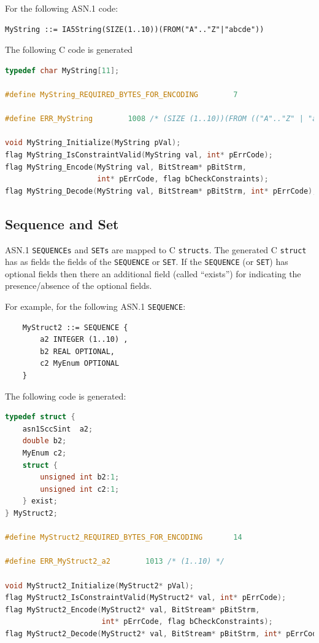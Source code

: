 \documentclass[11pt]{book}
\begin{document}
      For the following ASN.1 code:

\begin{lstlisting}
MyString ::= IA5String(SIZE(1..10))(FROM("A".."Z"|"abcde"))
\end{lstlisting}

      The following C code is generated

\begin{lstlisting}[language=c]
typedef char MyString[11];

#define MyString_REQUIRED_BYTES_FOR_ENCODING		7

#define ERR_MyString		1008 /* (SIZE (1..10))(FROM (("A".."Z" | "abcde"))) */

void MyString_Initialize(MyString pVal);
flag MyString_IsConstraintValid(MyString val, int* pErrCode);
flag MyString_Encode(MyString val, BitStream* pBitStrm, 
                     int* pErrCode, flag bCheckConstraints);
flag MyString_Decode(MyString val, BitStream* pBitStrm, int* pErrCode);
\end{lstlisting}

      \subsection{Sequence and Set}
      ASN.1 \texttt{SEQUENCEs} and \texttt{SETs} are mapped to C \texttt{structs}. 
      The generated C \texttt{struct} has as fields the fields of the \texttt{SEQUENCE} or \texttt{SET}. 
      If the \texttt{SEQUENCE} (or \texttt{SET}) has optional fields then there an additional 
      field (called “exists”) for indicating the presence/absence of the optional fields.

      For example, for the following ASN.1 \texttt{SEQUENCE}:

\begin{lstlisting}
	MyStruct2 ::= SEQUENCE {
		a2 INTEGER (1..10) ,
		b2 REAL OPTIONAL,
		c2 MyEnum OPTIONAL
	}
\end{lstlisting}

      The following code is generated:

\begin{lstlisting}[language=c]
typedef struct {
    asn1SccSint  a2;
    double b2;
    MyEnum c2;
    struct {
        unsigned int b2:1;
        unsigned int c2:1;
    } exist;
} MyStruct2;

#define MyStruct2_REQUIRED_BYTES_FOR_ENCODING		14

#define ERR_MyStruct2_a2		1013 /* (1..10) */

void MyStruct2_Initialize(MyStruct2* pVal);
flag MyStruct2_IsConstraintValid(MyStruct2* val, int* pErrCode);
flag MyStruct2_Encode(MyStruct2* val, BitStream* pBitStrm, 
                      int* pErrCode, flag bCheckConstraints);
flag MyStruct2_Decode(MyStruct2* val, BitStream* pBitStrm, int* pErrCode);
\end{lstlisting}
\end{document}

